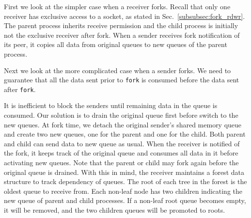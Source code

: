

First we look at the simpler case when a receiver forks. Recall that only one receiver has exclusive access to a socket, as stated in Sec.~\ref{subsubsec:fork_rdwr}. The parent process inherits receive permission and the child process is initially not the exclusive receiver after fork. When a sender receives fork notification of its peer, it copies all data from original queues to new queues of the parent process.

Next we look at the more complicated case when a sender forks. We need to guarantee that all the data sent prior to \texttt{fork} is consumed before the data sent after \texttt{fork}. 

It is inefficient to block the senders until remaining data in the queue is consumed. Our solution is to drain the original queue first before switch to the new queues. At fork time, we detach the original sender's shared memory queue and create two new queues, one for the parent and one for the child. Both parent and child can send data to new queue as usual. When the receiver is notified of the fork, it keeps track of the original queue and consumes all data in it before activating new queues. Note that the parent or child may fork again before the original queue is drained. With this in mind, the receiver maintains a forest data structure to track dependency of queues. The root of each tree in the forest is the oldest queue to receive from. Each non-leaf node has two children indicating the new queue of parent and child processes. If a non-leaf root queue becomes empty, it will be removed, and the two children queues will be promoted to roots.

